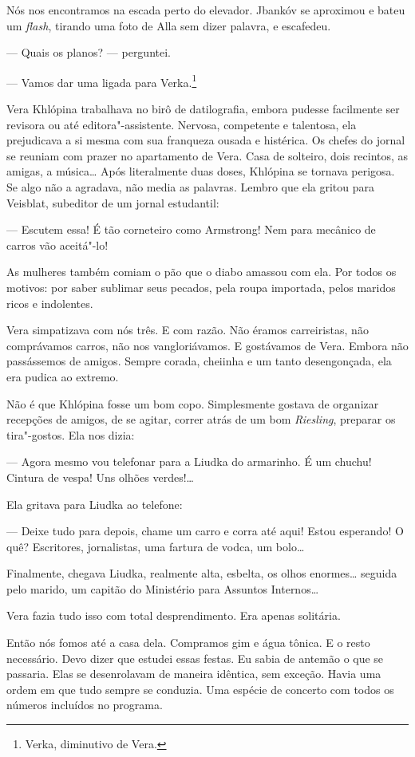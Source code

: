 Nós nos encontramos na escada perto do elevador. Jbankóv se aproximou e
bateu um \emph{flash}, tirando uma foto de Alla sem dizer palavra, e
escafedeu.

--- Quais os planos? --- perguntei.

--- Vamos dar uma ligada para Verka.\footnote{Verka, diminutivo de Vera.}

Vera Khlópina trabalhava no birô de datilografia, embora pudesse
facilmente ser revisora ou até editora"-assistente. Nervosa, competente e
talentosa, ela prejudicava a si mesma com sua franqueza ousada e
histérica. Os chefes do jornal se reuniam com prazer no apartamento de
Vera. Casa de solteiro, dois recintos, as amigas, a música\ldots{} Após
literalmente duas doses, Khlópina se tornava perigosa. Se algo não a
agradava, não media as palavras. Lembro que ela gritou para Veisblat,
subeditor de um jornal estudantil:

--- Escutem essa! É tão corneteiro como Armstrong! Nem para mecânico de
carros vão aceitá"-lo!

As mulheres também comiam o pão que o diabo amassou com ela. Por todos
os motivos: por saber sublimar seus pecados, pela roupa importada, pelos
maridos ricos e indolentes.

Vera simpatizava com nós três. E com razão. Não éramos carreiristas, não
comprávamos carros, não nos vangloriávamos. E gostávamos de Vera. Embora
não passássemos de amigos. Sempre corada, cheiinha e um tanto
desengonçada, ela era pudica ao extremo.

Não é que Khlópina fosse um bom copo. Simplesmente gostava de organizar
recepções de amigos, de se agitar, correr atrás de um bom
\emph{Riesling}, preparar os tira"-gostos. Ela nos dizia:

--- Agora mesmo vou telefonar para a Liudka do armarinho. É um chuchu!
Cintura de vespa! Uns olhões verdes!\ldots{}

Ela gritava para Liudka ao telefone:

--- Deixe tudo para depois, chame um carro e corra até aqui! Estou
esperando! O quê? Escritores, jornalistas, uma fartura de vodca, um
bolo\ldots{}

Finalmente, chegava Liudka, realmente alta, esbelta, os olhos enormes\ldots{}
seguida pelo marido, um capitão do Ministério para Assuntos Internos\ldots{}

Vera fazia tudo isso com total desprendimento. Era apenas solitária.

Então nós fomos até a casa dela. Compramos gim e água tônica. E o resto
necessário. Devo dizer que estudei essas festas. Eu sabia de antemão o
que se passaria. Elas se desenrolavam de maneira idêntica, sem exceção.
Havia uma ordem em que tudo sempre se conduzia. Uma espécie de concerto
com todos os números incluídos no programa.

